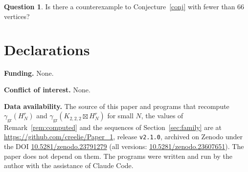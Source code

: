 \documentclass[11pt,a4paper,reqno]{amsart}
\theoremstyle{definition}
\newtheorem{question}[theorem]{Question}
\theoremstyle{remark}
\numberwithin{equation}{section}
\newcommand{\ggr}{\gamma_{\mathrm{gr}}}
\newcommand{\sprod}{\boxtimes}
\newcommand{\oct}{K_{2,2,2}}
\begin{document}
\begin{question}
Is there a counterexample to Conjecture~\ref{conj} with fewer than $66$ vertices?
\end{question}

\section*{Declarations}

\noindent\textbf{Funding.} None.

\smallskip
\noindent\textbf{Conflict of interest.} None.

\smallskip
\noindent\textbf{Data availability.} The source of this paper and programs that recompute $\ggr(H^r_N)$ and $\ggr(\oct\sprod H^r_N)$ for small $N$, the values of Remark~\ref{rem:computed} and the sequences of Section~\ref{sec:family} are at \url{https://github.com/creelie/Paper_1}, release \texttt{v2.1.0}, archived on Zenodo under the DOI \href{https://doi.org/10.5281/zenodo.23791279}{10.5281/zenodo.23791279} (all versions: \href{https://doi.org/10.5281/zenodo.23607651}{10.5281/zenodo.23607651}). The paper does not depend on them. The programs were written and run by the author with the assistance of Claude Code.
\end{document}
